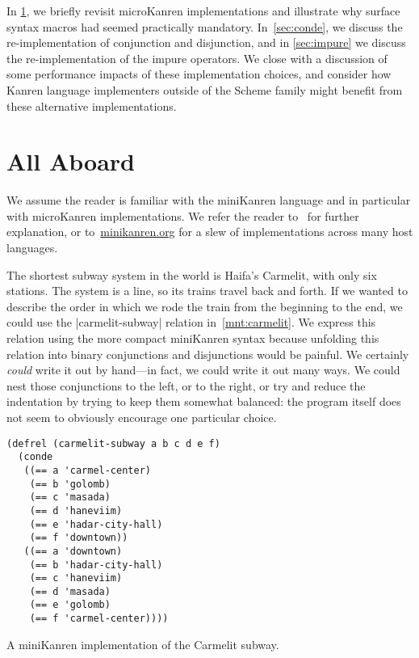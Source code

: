 \documentclass[sigplan,screen,draft,anonymous,review,natbib=false]{acmart}
\begin{document}
In \cref{sec:all-aboard}, we briefly revisit microKanren
implementations and illustrate why surface syntax
macros had seemed practically mandatory. In~\cref{sec:conde}, we discuss
the re-implementation of conjunction and disjunction, and in
\cref{sec:impure} we discuss the re-implementation of the impure
operators. We close with a discussion of some performance impacts of
these implementation choices, and consider how Kanren language
implementers outside of the Scheme family might benefit from these
alternative implementations.

\section{All Aboard}\label{sec:all-aboard}

We assume the reader is familiar with the miniKanren language and in
particular with microKanren implementations. We refer the reader
to~\cite{friedman2018reasoned,hemann2013muKanren,hemann2016small} for
further explanation, or to~\href{minikanren.org}{minikanren.org} for a
slew of implementations across many host languages.

The shortest subway system in the world is Haifa's Carmelit, with only
six stations. The system is a line, so its trains travel back and
forth. If we wanted to describe the order in which we rode the train
from the beginning to the end, we could use the
\rackinline|carmelit-subway| relation in~\cref{mnt:carmelit}. We
express this relation using the more compact miniKanren syntax because
unfolding this relation into binary conjunctions and disjunctions
would be painful. We certainly \emph{could} write it out by hand---in
fact, we could write it out many ways. We could nest those
conjunctions to the left, or to the right, or try and reduce the
indentation by trying to keep them somewhat balanced: the program
itself does not seem to obviously encourage one particular choice.

\begin{listing}
  \begin{verbatim}
(defrel (carmelit-subway a b c d e f)
  (conde
   ((== a 'carmel-center)
    (== b 'golomb)
    (== c 'masada)
    (== d 'haneviim)
    (== e 'hadar-city-hall)
    (== f 'downtown))
   ((== a 'downtown)
    (== b 'hadar-city-hall)
    (== c 'haneviim)
    (== d 'masada)
    (== e 'golomb)
    (== f 'carmel-center))))
  \end{verbatim}
  \caption{A miniKanren implementation of the Carmelit subway.}
  \label{mnt:carmelit}
\end{listing}
\end{document}
